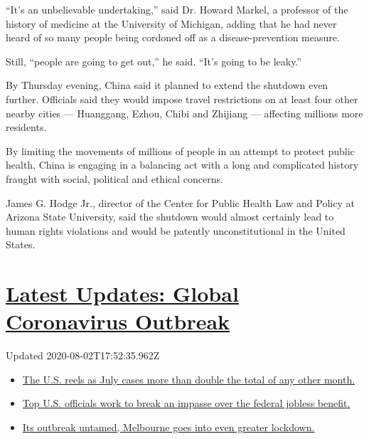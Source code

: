 ``It's an unbelievable undertaking,'' said Dr. Howard Markel, a
professor of the history of medicine at the University of Michigan,
adding that he had never heard of so many people being cordoned off as a
disease-prevention measure.

Still, ``people are going to get out,'' he said. ``It's going to be
leaky.''

By Thursday evening, China said it planned to extend the shutdown even
further. Officials said they would impose travel restrictions on at
least four other nearby cities --- Huanggang, Ezhou, Chibi and Zhijiang
--- affecting millions more residents.

By limiting the movements of millions of people in an attempt to protect
public health, China is engaging in a balancing act with a long and
complicated history fraught with social, political and ethical concerns.

James G. Hodge Jr., director of the Center for Public Health Law and
Policy at Arizona State University, said the shutdown would almost
certainly lead to human rights violations and would be patently
unconstitutional in the United States.

\hypertarget{latest-updates-global-coronavirus-outbreak}{%
\section{\texorpdfstring{\href{https://www.nytimes.com/2020/08/01/world/coronavirus-covid-19.html?action=click\&pgtype=Article\&state=default\&region=MAIN_CONTENT_1\&context=storylines_live_updates}{Latest
Updates: Global Coronavirus
Outbreak}}{Latest Updates: Global Coronavirus Outbreak}}\label{latest-updates-global-coronavirus-outbreak}}

Updated 2020-08-02T17:52:35.962Z

\begin{itemize}
\tightlist
\item
  \href{https://www.nytimes.com/2020/08/01/world/coronavirus-covid-19.html?action=click\&pgtype=Article\&state=default\&region=MAIN_CONTENT_1\&context=storylines_live_updates\#link-34047410}{The
  U.S. reels as July cases more than double the total of any other
  month.}
\item
  \href{https://www.nytimes.com/2020/08/01/world/coronavirus-covid-19.html?action=click\&pgtype=Article\&state=default\&region=MAIN_CONTENT_1\&context=storylines_live_updates\#link-780ec966}{Top
  U.S. officials work to break an impasse over the federal jobless
  benefit.}
\item
  \href{https://www.nytimes.com/2020/08/01/world/coronavirus-covid-19.html?action=click\&pgtype=Article\&state=default\&region=MAIN_CONTENT_1\&context=storylines_live_updates\#link-2bc8948}{Its
  outbreak untamed, Melbourne goes into even greater lockdown.}
\end{itemize}

